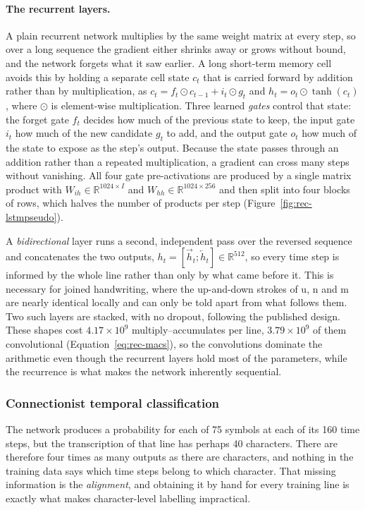 \paragraph{The recurrent layers.}
A plain recurrent network multiplies by the same weight matrix at every step, so over a long sequence the gradient either shrinks away or grows without bound, and the network forgets what it saw earlier. A long short-term memory cell~\cite{hochreiter1997} avoids this by holding a separate cell state $c_t$ that is carried forward by addition rather than by multiplication, as $c_t=f_t\odot c_{t-1}+i_t\odot g_t$ and $h_t=o_t\odot\tanh(c_t)$, where $\odot$ is element-wise multiplication. Three learned \emph{gates} control that state: the forget gate $f_t$ decides how much of the previous state to keep, the input gate $i_t$ how much of the new candidate $g_t$ to add, and the output gate $o_t$ how much of the state to expose as the step's output. Because the state passes through an addition rather than a repeated multiplication, a gradient can cross many steps without vanishing. All four gate pre-activations are produced by a single matrix product with $W_{ih}\in\mathbb R^{1024\times I}$ and $W_{hh}\in\mathbb R^{1024\times256}$ and then split into four blocks of rows, which halves the number of products per step (Figure~\ref{fig:rec-lstmpseudo}).

A \emph{bidirectional} layer runs a second, independent pass over the reversed sequence and concatenates the two outputs, $h_t=[\overrightarrow h_t;\overleftarrow h_t]\in\mathbb R^{512}$, so every time step is informed by the whole line rather than only by what came before it. This is necessary for joined handwriting, where the up-and-down strokes of u, n and m are nearly identical locally and can only be told apart from what follows them. Two such layers are stacked, with no dropout, following the published design.
These shapes cost $4.17\times10^9$ multiply--accumulates per line, $3.79\times10^9$ of them convolutional (Equation~\ref{eq:rec-macs}), so the convolutions dominate the arithmetic even though the recurrent layers hold most of the parameters, while the recurrence is what makes the network inherently sequential.


\subsubsection{Connectionist temporal classification}
\label{sec:rec-ctc}

The network produces a probability for each of 75 symbols at each of its 160 time steps, but the transcription of that line has perhaps 40 characters. There are therefore four times as many outputs as there are characters, and nothing in the training data says which time steps belong to which character. That missing information is the \emph{alignment}, and obtaining it by hand for every training line is exactly what makes character-level labelling impractical.

